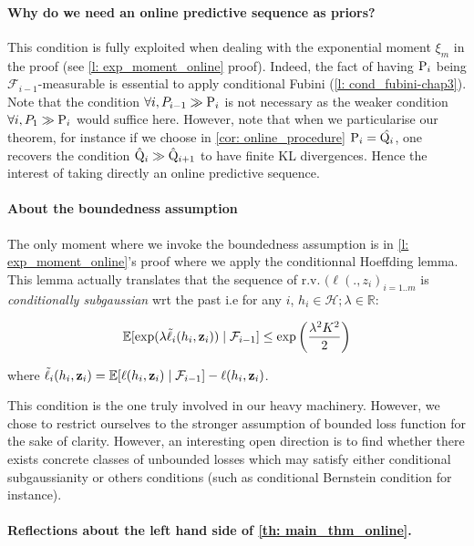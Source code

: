 \begin{noaddcontents}
\paragraph{Why do we need an online predictive sequence as priors? }

This condition is fully exploited when dealing with the exponential moment $\xi_m$ in the proof (see \cref{l: exp_moment_online} proof). Indeed, the fact of having $\P_{i}$ being $\mathcal{F}_{i-1}$-measurable is essential to apply conditional Fubini (\cref{l: cond_fubini-chap3}). Note that the condition $\forall i , P_{i-1}\gg \P_{i}$ is not necessary as the weaker condition $\forall i, P_1 \gg \P_{i}$ would suffice here.
However, note that when we particularise our theorem, for instance if we choose in \cref{cor: online_procedure} $\P_{i}= \hat{\Q_{i}}$, one recovers the condition $\hat{\Q}_{i}\gg\hat{\Q}_{i+1}$ to have finite KL divergences. Hence the interest of taking directly an online predictive sequence.

\paragraph{About the boundedness assumption}

The only moment where we invoke the boundedness assumption is in \cref{l: exp_moment_online}'s proof where we apply the conditionnal Hoeffding lemma. This lemma actually translates that the sequence of r.v. $(\ell(.,z_i)_{i=1..m}$ is \emph{conditionally subgaussian} wrt the past i.e for any $i$, $h_i\in\mathcal{H}; \lambda\in\mathbb{R}$:

\[ \mathbb{E}[\exp(\lambda \Tilde{\ell}_i(h_i,\z_i)) \mid \mathcal{F}_{i-1}] \leq \exp\left( \frac{\lambda^2K^2}{2}\right)\]

 where $\Tilde{\ell}_i(h_i,\z_i)= \mathbb{E}[\ell(h_i,\z_i)\mid \mathcal{F}_{i-1}]-  \ell(h_i,\z_i)$.

 This condition is the one truly involved in our heavy machinery. However, we chose to restrict ourselves to the stronger assumption of bounded loss function for the sake of clarity. However, an interesting open direction is to find whether there exists concrete classes of unbounded losses which may satisfy either conditional subgaussianity or others conditions (such as conditional Bernstein condition for instance).


 \paragraph{Reflections about the left hand side of \cref{th: main_thm_online}.}


\end{noaddcontents}
